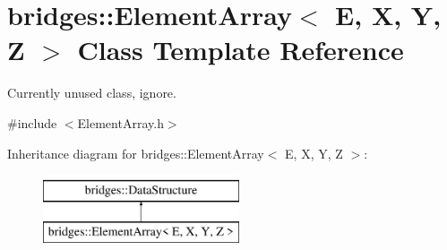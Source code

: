 \hypertarget{classbridges_1_1_element_array}{}\section{bridges\+::Element\+Array$<$ E, X, Y, Z $>$ Class Template Reference}
\label{classbridges_1_1_element_array}


Currently unused class, ignore.  




{\ttfamily \#include $<$Element\+Array.\+h$>$}

Inheritance diagram for bridges\+::Element\+Array$<$ E, X, Y, Z $>$\+:\begin{figure}[H]
\begin{center}
\leavevmode
\includegraphics[height=2.000000cm]{classbridges_1_1_element_array}
\end{center}
\end{figure}
